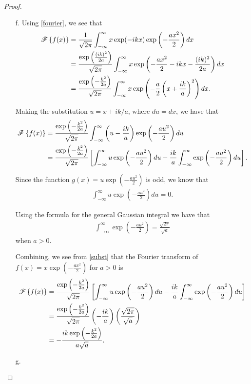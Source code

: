 \begin{proof}
\begin{enumerate}
    \item [f.] Using \eqref{fourier}, we see that
      \begin{align*}
        \mathscr{F}\left\{ {f(x)} \right\} &= \frac{1}{\sqrt{2 \pi}} \int_{-\infty}^{\infty} x \exp(-ikx) \exp\left(-\frac{ax^2}{2}\right) dx \\
        &= \frac{\exp\left( \frac{(ik)^2}{2a} \right)}{\sqrt{2 \pi}} \int_{-\infty}^{\infty} x \exp\left(-\frac{ax^2}{2} - ikx - \frac{(ik)^2}{2a}\right)  dx \\
        &= \frac{\exp\left( -\frac{k^2}{2a} \right)}{\sqrt{2 \pi}} \int_{-\infty}^{\infty} x \exp\left(-\frac{a}{2} \left(x + \frac{ik}{a}\right)^2 \right)  dx.
      \end{align*}

      Making the substitution $u = x + ik/a$, where $du = dx$, we have that
      \begin{align}\label{subst}
        \mathscr{F}\left\{ {f(x)} \right\} &= \frac{\exp\left( -\frac{k^2}{2a} \right)}{\sqrt{2 \pi}} \int_{-\infty}^{\infty} \left(u - \frac{ik}{a}\right) \exp\left(-\frac{au^2}{2}  \right)  du \notag \\
        &= \frac{\exp\left( -\frac{k^2}{2a} \right)}{\sqrt{2 \pi}} \left[\int_{-\infty}^{\infty} u\exp\left(-\frac{au^2}{2}  \right) du - \frac{ik}{a}\int_{-\infty}^{\infty} \exp\left(-\frac{au^2}{2}  \right)du\right].
      \end{align}

      Since the function $g(x) = u\exp\left(-\frac{au^2}{2}\right)$ is odd, we know that
      \begin{align*}
        \int_{-\infty}^{\infty} u\exp\left(-\frac{au^2}{2}  \right) du = 0.
      \end{align*}

      Using the formula for the general Gaussian integral we have that
      \begin{align*}
        \int_{-\infty}^{\infty} \exp\left(-\frac{au^2}{2}  \right) = \frac{\sqrt{2\pi}}{\sqrt{a}}
      \end{align*}
      when $a > 0$.

      Combining, we see from \eqref{subst} that the Fourier transform of $\displaystyle f(x) = x \exp \left( -\frac{a x^2}{2} \right)$ for $a > 0$
      is
      \begin{align*}
        \mathscr{F}\left\{ {f(x)} \right\} &= \frac{\exp\left( -\frac{k^2}{2a} \right)}{\sqrt{2 \pi}} \left[\int_{-\infty}^{\infty} u\exp\left(-\frac{au^2}{2}  \right) du - \frac{ik}{a}\int_{-\infty}^{\infty} \exp\left(-\frac{au^2}{2}  \right)du\right] \\
        &= \frac{\exp\left( -\frac{k^2}{2a} \right)}{\sqrt{2 \pi}} \left(- \frac{ik}{a}\right) \left(\frac{\sqrt{2\pi}}{\sqrt{a}}\right) \\
        &= - \frac{ik\exp\left( -\frac{k^2}{2a} \right)}{a\sqrt{a}} .
      \end{align*}

    \item [g.]
  \end{enumerate}
\end{proof}
\newpage
